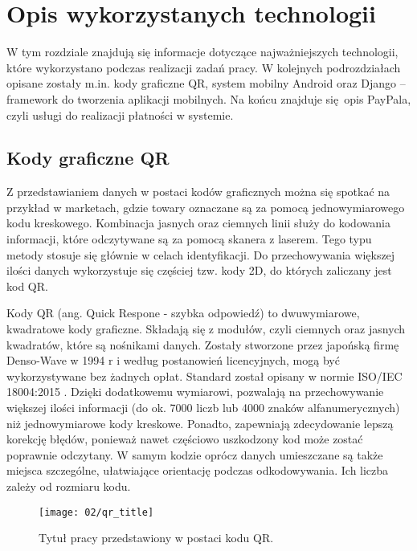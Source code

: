 \section{Opis wykorzystanych technologii}
W tym rozdziale znajdują się informacje dotyczące najważniejszych technologii, które wykorzystano podczas realizacji zadań pracy. W kolejnych podrozdziałach opisane zostały m.in. kody graficzne QR, system mobilny Android oraz Django -- framework do tworzenia aplikacji mobilnych. Na końcu znajduje się opis PayPala, czyli usługi do realizacji płatności w systemie.

\subsection{Kody graficzne QR}
Z przedstawianiem danych w postaci kodów graficznych można się spotkać na przykład w marketach, gdzie towary oznaczane są za pomocą jednowymiarowego kodu kreskowego. Kombinacja jasnych oraz ciemnych linii służy do kodowania informacji, które odczytywane są za pomocą skanera z laserem. Tego typu metody stosuje się głównie w celach identyfikacji. Do przechowywania większej ilości danych wykorzystuje się częściej tzw. kody 2D, do których zaliczany jest kod QR.

Kody QR (ang. Quick Respone - szybka odpowiedź) to dwuwymiarowe, kwadratowe kody graficzne. Składają się z modułów, czyli ciemnych oraz jasnych kwadratów, które są nośnikami danych. Zostały stworzone przez japońską firmę Denso-Wave w 1994 r \cite{thonky_tutorial} i według postanowień licencyjnych, mogą być wykorzystywane bez żadnych opłat. Standard został opisany w normie ISO/IEC 18004:2015 \cite{norma_qr}. Dzięki dodatkowemu wymiarowi, pozwalają na przechowywanie większej ilości informacji (do ok. 7000 liczb lub 4000 znaków alfanumerycznych) niż jednowymiarowe kody kreskowe. Ponadto, zapewniają zdecydowanie lepszą korekcję błędów, ponieważ nawet częściowo uszkodzony kod może zostać poprawnie odczytany. W samym kodzie oprócz danych umieszczane są także miejsca szczególne, ułatwiające orientację podczas odkodowywania. Ich liczba zależy od rozmiaru kodu.

\begin{figure}[h]
	\begin{center}
		\texttt{[image: 02/qr\_title]}
	\end{center}
	\caption{Tytuł pracy przedstawiony w postaci kodu QR.}
	\vspace{-0.3cm}
\end{figure}

